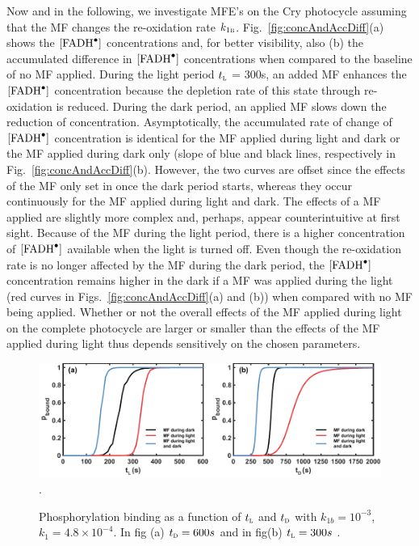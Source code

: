 \documentclass[twoside,twocolumn,9pt]{article}
\begin{document}
Now and in the following, we investigate MFE's on the Cry photocycle assuming that the MF changes the re-oxidation rate $k_{1\textsc{b}}$. Fig.~\ref{fig:concAndAccDiff}(a) shows the $[\ce{FADH^{.}}]$ concentrations and, for better visibility, also (b) the accumulated difference in $[\ce{FADH^{.}}]$ concentrations when compared to the baseline of no MF applied. During the light period $t_{\textsc{l}}$ = 300s, an added MF enhances the $[\ce{FADH^{.}}]$ concentration because the depletion rate of this state through re-oxidation is reduced. During the dark period, an applied MF slows down the reduction of concentration. Asymptotically, the accumulated rate of change of $[\ce{FADH^{.}}]$ concentration is identical for the MF applied during light and dark or the MF applied during dark only (slope of blue and black lines, respectively in Fig.~\ref{fig:concAndAccDiff}(b). However, the two curves are offset since the effects of the MF only set in once the dark period starts, whereas they occur continuously for the MF applied during light and dark. The effects of a MF applied are slightly more complex and, perhaps, appear counterintuitive at first sight. Because of the MF during the light period, there is a higher concentration of $[\ce{FADH^{.}}]$ available when the light is turned off. Even though the re-oxidation rate is no longer affected by the MF during the dark period, the $[\ce{FADH^{.}}]$ concentration remains higher in the dark if a MF was applied during the light (red curves in Figs.~\ref{fig:concAndAccDiff}(a) and (b)) when compared with no MF being applied. Whether or not the overall effects of the MF applied during light on the complete photocycle are larger or smaller than the effects of the MF applied during light thus depends sensitively on the chosen parameters.

\begin{figure}[h]
	\centering
	\includegraphics{varyT1T2.pdf}.
	\caption{Phosphorylation binding as a function of $t_{\textsc{l}}$ and $t_{\textsc{d}}$ with $k_{1b} = 10^{-3}$, $k_{1} = 4.8 \times 10^{-4}$. In fig (a) $t_{\textsc{d}} = 600s$ and in fig(b) $t_{\textsc{l}} = 300s$ .}
	\label{fig:varyT1T2}
\end{figure}
\end{document}
